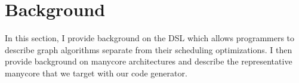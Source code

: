 \chapter{Background}\label{gen:sec:background}

In this section, I provide background on the \graphit DSL which allows programmers to describe graph algorithms separate from their scheduling optimizations.
I then provide background on manycore architectures and describe the representative manycore that we target with our code generator. 



